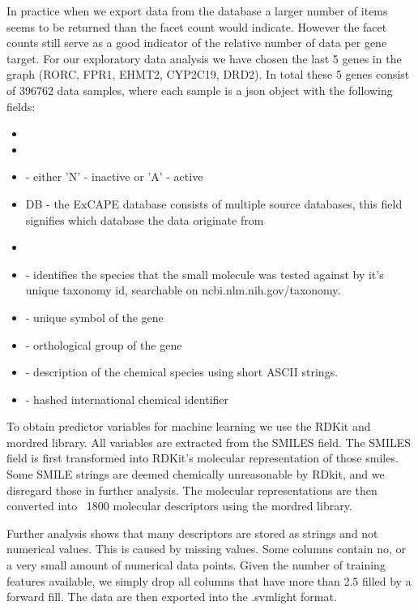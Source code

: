 \documentclass[11pt]{article}
\begin{document}
    In practice when we export data from the database a larger number of items seems to be returned than the facet count would indicate.
    However the facet counts still serve as a good indicator of the relative number of data per gene target.
    For our exploratory data analysis we have chosen the last 5 genes in the graph (RORC, FPR1, EHMT2, CYP2C19, DRD2).
    In total these 5 genes consist of 396762 data samples, where each sample is a json object with the following fields:
    \begin{itemize}
        \item {}
        \item {}
        \item {} - either 'N' - inactive or 'A' - active
        \item DB - the ExCAPE database consists of multiple source databases, this field signifies which database the data originate from
        \item {}
        \item {} - identifies the species that the small molecule was tested against by it's unique taxonomy id, searchable on ncbi.nlm.nih.gov/taxonomy.
        \item {} - unique symbol of the gene
        \item {} - orthological group of the gene
        \item {} - description of the chemical species using short ASCII strings.
        \item {} - hashed international chemical identifier
    \end{itemize}

    To obtain predictor variables for machine learning we use the RDKit and mordred library.
    All variables are extracted from the SMILES field. The SMILES field is first transformed into RDKit's molecular representation of those smiles.
    Some SMILE strings are deemed chemically unreasonable
    by RDkit, and we disregard those in further analysis.
    The molecular representations are then converted into ~1800 molecular descriptors using the
    mordred library.

    Further analysis shows that many descriptors are stored as strings and not numerical values.
    This is caused by missing values. Some columns contain no, or a very small amount of
    numerical data points. Given the number of training features available, we simply drop all columns that have more than 2.5%
    filled by a forward fill.
    The data are then exported into the .svmlight format.
\end{document}
